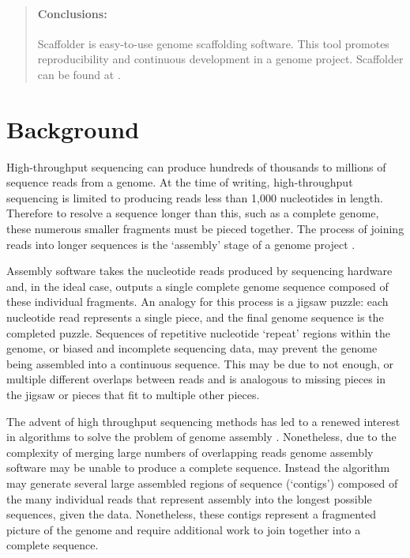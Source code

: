 \documentclass[10pt]{bmc_article}
\newenvironment{bmcformat}{\begin{raggedright}\baselineskip20pt\sloppy\setboolean{publ}{false}}{\end{raggedright}\baselineskip20pt\sloppy}
\begin{document}
\begin{bmcformat}
\begin{abstract}
  \paragraph*{Conclusions:} Scaffolder is easy-to-use genome scaffolding
  software. This tool promotes reproducibility and continuous development in a
  genome project. Scaffolder can be found at \scaffolder.

\end{abstract}


\clearpage

\section*{Background} %

High-throughput sequencing can produce hundreds of thousands to millions of
sequence reads from a genome. At the time of writing, high-throughput
sequencing is limited to producing reads less than 1,000 nucleotides in length.
Therefore to resolve a sequence longer than this, such as a complete genome,
these numerous smaller fragments must be pieced together. The process of
joining reads into longer sequences is the `assembly' stage of a genome project
\cite{miller2010}. \pb

Assembly software takes the nucleotide reads produced by sequencing hardware
and, in the ideal case, outputs a single complete genome sequence composed of
these individual fragments. An analogy for this process is a jigsaw puzzle:
each nucleotide read represents a single piece, and the final genome sequence
is the completed puzzle. Sequences of repetitive nucleotide `repeat' regions
within the genome, or biased and incomplete sequencing data, may prevent the
genome being assembled into a continuous sequence. This may be due to not
enough, or multiple different overlaps between reads and is analogous to
missing pieces in the jigsaw or pieces that fit to multiple other pieces. \pb

The advent of high throughput sequencing methods has led to a renewed interest
in algorithms to solve the problem of genome assembly \cite{pop2008,pop2009}.
Nonetheless, due to the complexity of merging large numbers of overlapping
reads genome assembly software may be unable to produce a complete sequence.
Instead the algorithm may generate several large assembled regions of sequence
(`contigs') composed of the many individual reads that represent assembly into
the longest possible sequences, given the data. Nonetheless, these contigs
represent a fragmented picture of the genome and require additional work to
join together into a complete sequence. \pb


\end{bmcformat}
\end{document}
